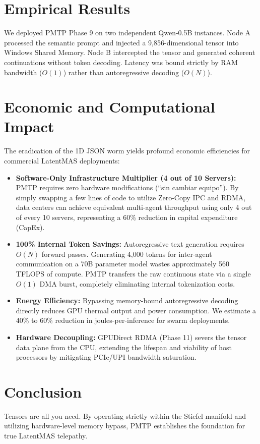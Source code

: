 \documentclass[11pt, a4paper]{article}
\begin{document}
\section{Empirical Results}
We deployed PMTP Phase 9 on two independent Qwen-0.5B instances. Node A processed the semantic prompt and injected a 9,856-dimensional tensor into Windows Shared Memory. Node B intercepted the tensor and generated coherent continuations without token decoding. Latency was bound strictly by RAM bandwidth ($O(1)$) rather than autoregressive decoding ($O(N)$).

\section{Economic and Computational Impact}
The eradication of the 1D JSON worm yields profound economic efficiencies for commercial LatentMAS deployments:
\begin{itemize}
    \item \textbf{Software-Only Infrastructure Multiplier (4 out of 10 Servers):} PMTP requires zero hardware modifications (``sin cambiar equipo''). By simply swapping a few lines of code to utilize Zero-Copy IPC and RDMA, data centers can achieve equivalent multi-agent throughput using only 4 out of every 10 servers, representing a 60\% reduction in capital expenditure (CapEx).
    \item \textbf{100\% Internal Token Savings:} Autoregressive text generation requires $O(N)$ forward passes. Generating 4,000 tokens for inter-agent communication on a 70B parameter model wastes approximately 560 TFLOPS of compute. PMTP transfers the raw continuous state via a single $O(1)$ DMA burst, completely eliminating internal tokenization costs.
    \item \textbf{Energy Efficiency:} Bypassing memory-bound autoregressive decoding directly reduces GPU thermal output and power consumption. We estimate a 40\% to 60\% reduction in joules-per-inference for swarm deployments.
    \item \textbf{Hardware Decoupling:} GPUDirect RDMA (Phase 11) severs the tensor data plane from the CPU, extending the lifespan and viability of host processors by mitigating PCIe/UPI bandwidth saturation.
\end{itemize}

\section{Conclusion}
Tensors are all you need. By operating strictly within the Stiefel manifold and utilizing hardware-level memory bypass, PMTP establishes the foundation for true LatentMAS telepathy.
\end{document}

